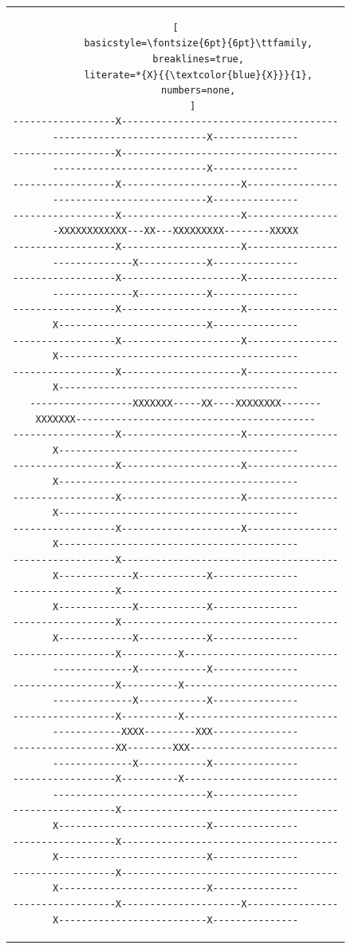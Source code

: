 \documentclass[12pt,a4paper]{article}
\begin{document}
\begin{figure}[H]
\begin{tabular}{c}
\begin{lstlisting}[
        basicstyle=\fontsize{6pt}{6pt}\ttfamily,
        breaklines=true,
        literate=*{X}{{\textcolor{blue}{X}}}{1},
        numbers=none,
      ]
------------------X-----------------------------------------------------------------X---------------
------------------X-----------------------------------------------------------------X---------------
------------------X---------------------X-------------------------------------------X---------------
------------------X---------------------X-----------------XXXXXXXXXXXX---XX---XXXXXXXXX--------XXXXX
------------------X---------------------X------------------------------X------------X---------------
------------------X---------------------X------------------------------X------------X---------------
------------------X---------------------X----------------X--------------------------X---------------
------------------X---------------------X----------------X------------------------------------------
------------------X---------------------X----------------X------------------------------------------
------------------XXXXXXX-----XX----XXXXXXXX-------XXXXXXX------------------------------------------
------------------X---------------------X----------------X------------------------------------------
------------------X---------------------X----------------X------------------------------------------
------------------X---------------------X----------------X------------------------------------------
------------------X---------------------X----------------X------------------------------------------
------------------X--------------------------------------X-------------X------------X---------------
------------------X--------------------------------------X-------------X------------X---------------
------------------X--------------------------------------X-------------X------------X---------------
------------------X----------X-----------------------------------------X------------X---------------
------------------X----------X-----------------------------------------X------------X---------------
------------------X----------X---------------------------------------XXXX---------XXX---------------
------------------XX--------XXX----------------------------------------X------------X---------------
------------------X----------X------------------------------------------------------X---------------
------------------X--------------------------------------X--------------------------X---------------
------------------X--------------------------------------X--------------------------X---------------
------------------X--------------------------------------X--------------------------X---------------
------------------X---------------------X----------------X--------------------------X---------------

\end{lstlisting}
\end{tabular}
\end{figure}
\end{document}
